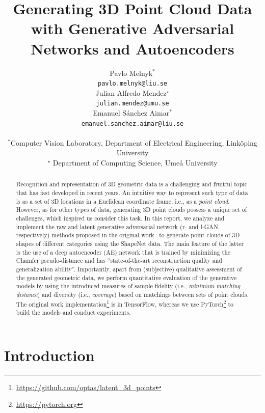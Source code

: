 \documentclass[12pt]{article}
\title{Generating 3D Point Cloud Data with Generative Adversarial Networks and Autoencoders}
\author{
    Pavlo Melnyk$^*$ \\
    \texttt{pavlo.melnyk@liu.se} \\
    \And
    Julian Alfredo Mendez$^\star $ \\
    \texttt{julian.mendez@umu.se} \\
    \And
    Emanuel S\'{a}nchez Aimar$^*$ \\
    \texttt{emanuel.sanchez.aimar@liu.se} \\
    \\
    {\small $^*$Computer Vision Laboratory, Department of Electrical Engineering, Linköping University} \\
    {\small $^\star$ Department of Computing Science, Umeå University}
}
\newcommand{\contentdescription}[1]{}
\begin{document}
    \maketitle

    \begin{abstract}
        \contentdescription{
            Abstract (5-10\%):
            Give an overview of what you have done in the project with the key results and findings of your work.
            Should be no more than 300 words.
        }

        Recognition and representation of 3D geometric data is a challenging and fruitful topic that has fast developed in recent years. An intuitive way to represent such type of data is as a set of 3D locations in a Euclidean coordinate frame, i.e., as a \textit{point cloud}. However, as for other types of data, generating 3D point clouds possess a unique set of challenges, which inspired us consider this task.
        In this report,  we analyze and implement the raw and latent generative adversarial network (r- and l-GAN, respectively) methods proposed in the original work~\cite{pmlr-v80-achlioptas18a} to generate point clouds of 3D shapes of different categories using the ShapeNet data. The main feature of the latter is the use of a deep autoencoder (AE) network that is trained by minimizing the Chamfer pseudo-distance and has ``state-of-the-art reconstruction quality and generalization ability''.
        Importantly, apart from (subjective) qualitative assessment of the generated geometric data, we perform quantitative evaluation of the generative models by using the introduced measures of sample fidelity (i.e., \textit{minimum matching distance}) and diversity (i.e., \textit{coverage}) based on matchings between sets of point clouds.
        The original work implementation\footnote{\url{https://github.com/optas/latent_3d_points}} is in TensorFlow, whereas we use PyTorch\footnote{\url{https://pytorch.org}} to build the models and conduct experiments.
    \end{abstract}


    \section{Introduction}

    \contentdescription{
        Introduction (5-15\%):
        Describe the problem, the approach of the paper, the experiments, and the results.
        At the high-level talk about what you worked on in your project and why it is important.
        Then give an overview of your results.
    }
\end{document}
